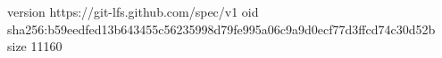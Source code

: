 version https://git-lfs.github.com/spec/v1
oid sha256:b59eedfed13b643455c56235998d79fe995a06c9a9d0ecf77d3ffcd74c30d52b
size 11160
